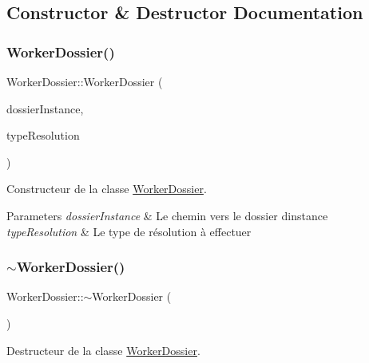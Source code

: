 \subsection{Constructor \& Destructor Documentation}
\mbox{\label{classWorkerDossier_ae62defa93ef94862572fda95736a03ed}} 
\subsubsection{\texorpdfstring{Worker\+Dossier()}{WorkerDossier()}}
{\footnotesize\ttfamily Worker\+Dossier\+::\+Worker\+Dossier (\begin{DoxyParamCaption}\item[{Q\+String}]{dossier\+Instance,  }\item[{Q\+String}]{type\+Resolution }\end{DoxyParamCaption})}



Constructeur de la classe \hyperlink{classWorkerDossier}{Worker\+Dossier}. 


\begin{DoxyParams}{Parameters}
{\em dossier\+Instance} & Le chemin vers le dossier d\textquotesingle{}instance \\
\hline
{\em type\+Resolution} & Le type de résolution à effectuer \\
\hline
\end{DoxyParams}
\mbox{\label{classWorkerDossier_ac2d339dcdd7e35d1fed6debf3495f904}} 
\subsubsection{\texorpdfstring{$\sim$\+Worker\+Dossier()}{~WorkerDossier()}}
{\footnotesize\ttfamily Worker\+Dossier\+::$\sim$\+Worker\+Dossier (\begin{DoxyParamCaption}{ }\end{DoxyParamCaption})}



Destructeur de la classe \hyperlink{classWorkerDossier}{Worker\+Dossier}. 



